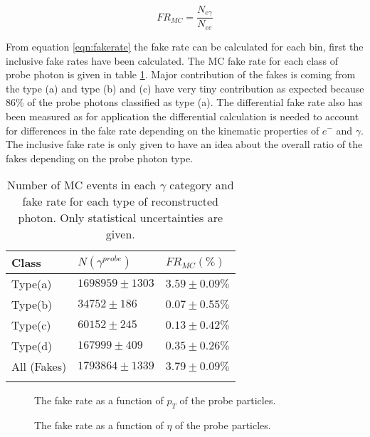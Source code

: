 \begin{equation}
FR_{MC} = \frac{N_{e\gamma}}{N_{ee}}
\label{eqn:fakerate}
\end{equation}

From equation \ref{eqn:fakerate} the fake rate can be calculated for each bin, first the inclusive fake rates have been calculated. The MC fake rate for each class of probe photon is given in table \ref{tab:mc_fc}. Major contribution of the fakes is coming from the type (a) and type (b) and (c) have very tiny contribution as expected because 86\% of the probe photons classified as type (a). The differential fake rate also has been measured as for application the differential calculation is needed to account for differences in the fake rate depending on the kinematic properties of $e^-$ and $\gamma$. The inclusive fake rate is only given to have an idea about the overall ratio of the fakes depending on the probe photon type.

\begin{table}
\caption{Number of MC events in each $\gamma$ category and fake rate for each type of reconstructed photon. Only statistical uncertainties are given.}
\label{tab:mc_fc}
\centering
\begin{tabular}{l l l }
\toprule
Class & $N(\gamma^{probe})$ & $FR_{MC}(\%)$\\
\midrule
Type(a) & $1698959\pm1303$ & $3.59\pm0.09\%$\\
Type(b) & $34752\pm186$ & $0.07\pm0.55\%$\\
Type(c) & $60152\pm245$ & $0.13\pm0.42\%$\\
Type(d) & $167999\pm409$  & $0.35\pm0.26\%$\\
All (Fakes) & $1793864\pm1339$ & $3.79\pm0.09\%$\\
\bottomrule\\
\end{tabular}
\end{table}

\begin{figure}[htbp]
\begin{center}
\scalebox{0.7}{}
\caption{The fake rate as a function of $p_{T}$ of the probe particles.}
\label{fig:mc_fc_pt}
\end{center}
\end{figure}

\begin{figure}[htbp]
\begin{center}
\scalebox{0.7}{}
\caption{The fake rate as a function of $\eta$ of the probe particles.}
\label{fig:mc_fc_eta}
\end{center}
\end{figure}

